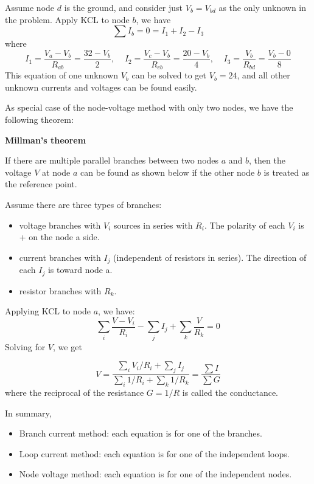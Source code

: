 \begin{itemize}
  Assume node $d$ is the ground, and consider just $V_b=V_{bd}$ as the 
  only unknown in the problem. Apply KCL to node $b$, we have
  \[	\sum I_b=0=I_1+I_2-I_3	\]
  where
  \[ I_1=\frac{V_a-V_b}{R_{ab}}=\frac{32-V_b}{2},\;\;\;\;
  I_2=\frac{V_c-V_b}{R_{cb}}=\frac{20-V_b}{4},\;\;\;\;
  I_3=\frac{V_b}{R_{bd}}=\frac{V_b-0}{8}  \]
  This equation of one unknown $V_b$ can be solved to get $V_b=24$, and 
  all other unknown currents and voltages can be found easily.

As special case of the node-voltage method with only two nodes, we have the
following theorem:

{\bf Millman's theorem} 

If there are multiple parallel branches between two
nodes $a$ and $b$, then the voltage $V$ at node $a$ can be found as shown
below if the other node $b$ is treated as the reference point.

Assume there are three types of branches:
\begin{itemize}
  \item voltage branches with $V_i$ sources in series with $R_i$. The
    polarity of each $V_i$ is + on the node a side.
  \item current branches with $I_j$ (independent of resistors in series).
    The direction of each $I_j$ is toward node a.
  \item resistor branches with $R_k$.
\end{itemize}

Applying KCL to node $a$, we have:
\[ \sum_i \frac{V-V_i}{R_i}-\sum_j I_j+\sum_k \frac{V}{R_k}=0 \]
Solving for $V$, we get

\[ V=\frac{\sum_i V_i/R_i+\sum_j I_j}{\sum_i 1/R_i+\sum_k 1/R_k}=\frac{\sum I}{\sum G} \]
where the reciprocal of the resistance $G=1/R$ is called the conductance.


\end{itemize}

In summary, 
\begin{itemize}
  \item Branch current method: each equation is for one of the branches.
  \item Loop  current method: each equation is for one of the independent loops.
  \item Node  voltage method: each equation is for one of the independent nodes.
\end{itemize}


